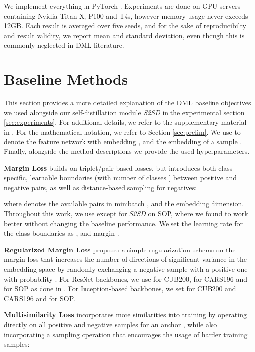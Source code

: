 \documentclass{article} \usepackage{arxiv_style,times}
\begin{document}
We implement everything in PyTorch \citep{pytorch}. Experiments are done on GPU servers containing Nvidia Titan X, P100 and T4s, however memory usage never exceeds 12GB.
Each result is averaged over five seeds, and for the sake of reproducibilty and result validity, we report mean and standard deviation, even though this is commonly neglected in DML literature.


\newpage
\section{Baseline Methods}\label{supp:base_methods}
This section provides a more detailed explanation of the DML baseline objectives we used alongside our self-distillation module \textit{S2SD} in the experimental section \ref{sec:experiments}. For additional details, we refer to the supplementary material in \cite{roth2020revisiting}. For the mathematical notation, we refer to Section \ref{sec:prelim}. We use  to denote the feature network  with embedding , and  the embedding of a sample . Finally, alongside the method descriptions we provide the used hyperparameters.

\textbf{Margin Loss} \citep{margin} builds on triplet/pair-based losses, but introduces both class-specific, learnable boundaries  (with number of classes ) between positive and negative pairs, as well as distance-based sampling for negatives:


where  denotes the available pairs in minibatch , and  the embedding dimension. Throughout this work, we use  except for \textit{S2SD} on SOP, where we found  to work better without changing the baseline performance. We set the learning rate for the class boundaries as , and margin .

\textbf{Regularized Margin Loss} \citep{roth2020revisiting} proposes a simple regularization scheme on the margin loss that increases the number of directions of significant variance in the embedding space by randomly exchanging a negative sample with a positive one with probability . For ResNet-backbones, we use  for CUB200,  for CARS196 and  for SOP as done in \cite{roth2020revisiting}. For Inception-based backbones, we set  for CUB200 and CARS196 and  for SOP.

\textbf{Multisimilarity Loss} \cite{multisimilarity} incorporates more similarities into training by operating directly on all positive and negative samples for an anchor , while also incorporating a sampling operation that encourages the usage of harder training samples:
\end{document}
